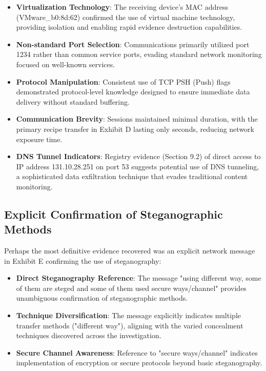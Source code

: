 \begin{itemize}
    \item \textbf{Virtualization Technology}: The receiving device's MAC address (VMware\_b0:8d:62) confirmed the use of virtual machine technology, providing isolation and enabling rapid evidence destruction capabilities.
    
    \item \textbf{Non-standard Port Selection}: Communications primarily utilized port 1234 rather than common service ports, evading standard network monitoring focused on well-known services.
    
    \item \textbf{Protocol Manipulation}: Consistent use of TCP PSH (Push) flags demonstrated protocol-level knowledge designed to ensure immediate data delivery without standard buffering.
    
    \item \textbf{Communication Brevity}: Sessions maintained minimal duration, with the primary recipe transfer in Exhibit D lasting only seconds, reducing network exposure time.
    
    \item \textbf{DNS Tunnel Indicators}: Registry evidence (Section 9.2) of direct access to IP address 131.10.28.251 on port 53 suggests potential use of DNS tunneling, a sophisticated data exfiltration technique that evades traditional content monitoring.
\end{itemize}

\subsection{Explicit Confirmation of Steganographic Methods}
Perhaps the most definitive evidence recovered was an explicit network message in Exhibit E confirming the use of steganography:

\begin{itemize}
    \item \textbf{Direct Steganography Reference}: The message "using different way, some of them are steged and some of them used secure ways/channel" provides unambiguous confirmation of steganographic methods.
    
    \item \textbf{Technique Diversification}: The message explicitly indicates multiple transfer methods ("different way"), aligning with the varied concealment techniques discovered across the investigation.
    
    \item \textbf{Secure Channel Awareness}: Reference to "secure ways/channel" indicates implementation of encryption or secure protocols beyond basic steganography.
\end{itemize}

